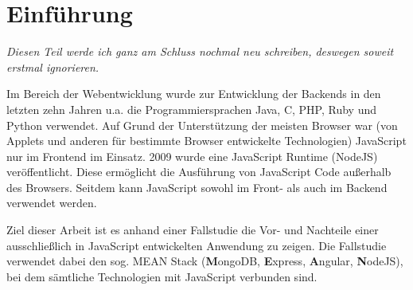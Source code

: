 \section{Einführung}\label{einfuerung-michi}

\emph{Diesen Teil werde ich ganz am Schluss nochmal neu schreiben,
deswegen soweit erstmal ignorieren.}

Im Bereich der Webentwicklung wurde zur Entwicklung der Backends in den
letzten zehn Jahren u.a. die Programmiersprachen Java, C, PHP, Ruby und
Python verwendet. Auf Grund der Unterstützung der meisten Browser war
(von Applets und anderen für bestimmte Browser entwickelte Technologien)
JavaScript nur im Frontend im Einsatz. 2009 wurde eine JavaScript
Runtime (NodeJS) veröffentlicht. Diese ermöglicht die Ausführung von
JavaScript Code außerhalb des Browsers. Seitdem kann JavaScript sowohl
im Front- als auch im Backend verwendet werden.

Ziel dieser Arbeit ist es anhand einer Fallstudie die Vor- und Nachteile
einer ausschließlich in JavaScript entwickelten Anwendung zu zeigen. Die
Fallstudie verwendet dabei den sog. MEAN Stack (\textbf{M}ongoDB,
\textbf{E}xpress, \textbf{A}ngular, \textbf{N}odeJS), bei dem sämtliche
Technologien mit JavaScript verbunden sind.